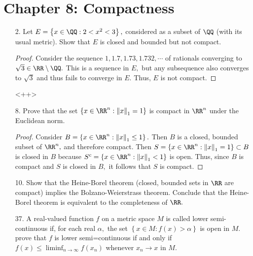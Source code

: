 \documentclass{article}
\begin{document}
\section*{Chapter 8: Compactness}

\begin{itemize}
	\item[2.] Let $E=\left\{ x\in\QQ:2<x^2<3 \right\},$ considered as a subset of $\QQ$ (with its usual metric). Show that $E$ is closed and bounded but not compact.
		\begin{proof}
			Consider the sequence $1, 1.7, 1.73, 1.732, \cdots$ of rationals converging to $\sqrt{3}\in\RR\setminus\QQ.$ This is a sequence in $E,$ but any subsequence also converges to $\sqrt{3}$ and thus fails to converge in $E.$ Thus, $E$ is not compact.
		\end{proof}<++>

	\item[8.] Prove that the set $\left\{ x\in\RR^n:\left\lVert x \right\rVert_1=1 \right\}$ is compact in $\RR^n$ under the Euclidean norm.
		\begin{proof}
			Consider $B=\left\{ x\in\RR^n: \left\lVert x \right\rVert_1\le 1 \right\}.$ Then $B$ is a closed, bounded subset of $\RR^n,$ and therefore compact. Then $S = \left\{ x\in\RR^n:\left\lVert x \right\rVert_1=1 \right\}\subset B$ is closed in $B$ because $S^c=\left\{ x\in\RR^n:\left\lVert x \right\rVert_1<1 \right\}$ is open. Thus, since $B$ is compact and $S$ is closed in $B,$ it follows that $S$ is compact.
		\end{proof}

	\item[10.] Show that the Heine-Borel theorem (closed, bounded sets in $\RR$ are compact) implies the Bolzano-Weierstrass theorem. Conclude that the Heine-Borel theorem is equivalent to the completeness of $\RR.$

	\item[37.] A real-valued function $f$ on a metric space $M$ is called lower semi-continuous if, for each real $\alpha,$ the set $\left\{ x\in M:f(x)>\alpha \right\}$ is open in $M.$ prove that $f$ is lower semi=continuous if and only if $f(x)\le \liminf_{n\to\infty} f(x_n)$ whenever $x_n\to x$ in $M.$


\end{itemize}
\end{document}
